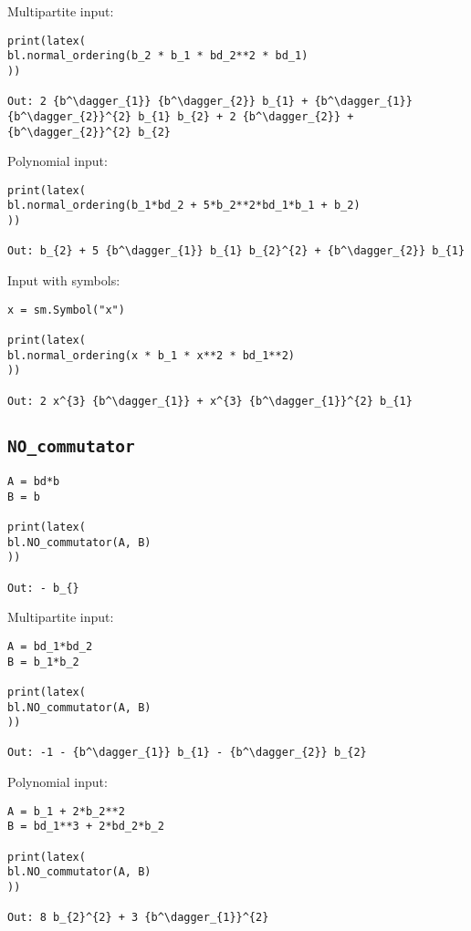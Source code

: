 \documentclass[5p, twocolumn, 10pt, sort&compress]{elsarticle}
\newcommand{\inlinecode}[1]{\texttt{#1}}
\begin{document}
\noindent Multipartite input:
\begin{verbatim}
print(latex(
bl.normal_ordering(b_2 * b_1 * bd_2**2 * bd_1)
))

Out: 2 {b^\dagger_{1}} {b^\dagger_{2}} b_{1} + {b^\dagger_{1}} {b^\dagger_{2}}^{2} b_{1} b_{2} + 2 {b^\dagger_{2}} + {b^\dagger_{2}}^{2} b_{2}
\end{verbatim}

\noindent Polynomial input:
\begin{verbatim}
print(latex(
bl.normal_ordering(b_1*bd_2 + 5*b_2**2*bd_1*b_1 + b_2)
))

Out: b_{2} + 5 {b^\dagger_{1}} b_{1} b_{2}^{2} + {b^\dagger_{2}} b_{1}
\end{verbatim}

\newpage
\noindent Input with symbols:
\begin{verbatim}
x = sm.Symbol("x")

print(latex(
bl.normal_ordering(x * b_1 * x**2 * bd_1**2)
))

Out: 2 x^{3} {b^\dagger_{1}} + x^{3} {b^\dagger_{1}}^{2} b_{1}
\end{verbatim}


\subsection{\inlinecode{NO_commutator}}

\begin{verbatim}
A = bd*b
B = b

print(latex(
bl.NO_commutator(A, B)
))

Out: - b_{}     
\end{verbatim}

\noindent Multipartite input:
\begin{verbatim}
A = bd_1*bd_2
B = b_1*b_2

print(latex(
bl.NO_commutator(A, B)
))

Out: -1 - {b^\dagger_{1}} b_{1} - {b^\dagger_{2}} b_{2}
\end{verbatim}

\noindent Polynomial input:
\begin{verbatim}
A = b_1 + 2*b_2**2
B = bd_1**3 + 2*bd_2*b_2

print(latex(
bl.NO_commutator(A, B)
))

Out: 8 b_{2}^{2} + 3 {b^\dagger_{1}}^{2}
\end{verbatim}
\end{document}
